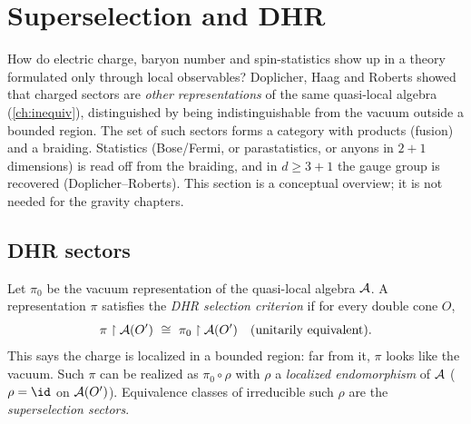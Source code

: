 \section{Superselection and DHR}\label{ch:dhr}
\skippable

\begin{physmotiv}
How do electric charge, baryon number and spin-statistics show up in a theory formulated only through local observables? Doplicher, Haag and Roberts \cite{DHR1971,DHR1974} showed that charged sectors are \emph{other representations} of the same quasi-local algebra (\cref{ch:inequiv}), distinguished by being indistinguishable from the vacuum outside a bounded region. The set of such sectors forms a category with products (fusion) and a braiding. Statistics (Bose/Fermi, or parastatistics, or anyons in $2+1$ dimensions) is read off from the braiding, and in $d\ge3+1$ the gauge group is recovered (Doplicher--Roberts). This section is a conceptual overview; it is not needed for the gravity chapters.
\end{physmotiv}

\subsection{DHR sectors}

Let $\pi_0$ be the vacuum representation of the quasi-local algebra $\mathcal{A}$. A representation $\pi$ satisfies the \emph{DHR selection criterion} if for every double cone $O$,
\begin{equation}
\pi\restriction\A(O')\ \cong\ \pi_0\restriction\A(O')\quad\text{(unitarily equivalent)}.
\end{equation}
This says the charge is localized in a bounded region: far from it, $\pi$ looks like the vacuum. Such $\pi$ can be realized as $\pi_0\circ\rho$ with $\rho$ a \emph{localized endomorphism} of $\mathcal{A}$ ($\rho=\id$ on $\mathcal{A}(O')$). Equivalence classes of irreducible such $\rho$ are the \emph{superselection sectors}.

